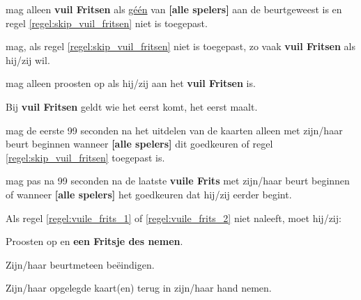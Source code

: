 \vervolgLijst{}
    \item \EenSpeler mag alleen \textbf{vuil Fritsen} als \ul{g\'e\'en} van \textbf{[alle spelers]} aan de beurt\footnotemark[1] geweest is en regel \ref{regel:skip_vuil_fritsen} niet is toegepast. 
\eindLijst{}

\vervolgLijst{}
    \item \EenSpeler mag, als regel \ref{regel:skip_vuil_fritsen} niet is toegepast, zo vaak \textbf{vuil Fritsen} als hij/zij wil. 
\eindLijst{}

\vervolgLijst{}
    \item \EenSpeler mag alleen proosten op  als hij/zij aan het \textbf{vuil Fritsen} is.
\eindLijst{}

\vervolgLijst{}
    \item Bij \textbf{vuil Fritsen} geldt wie het eerst komt, het eerst maalt.
\eindLijst{}


\vervolgLijst{}
    \item \Willem mag de eerste 99 seconden na het uitdelen van de kaarten alleen met zijn/haar beurt beginnen wanneer \textbf{[alle spelers]} dit goedkeuren of regel \ref{regel:skip_vuil_fritsen} toegepast is. 
    \label{regel:vuile_frits_1}
\eindLijst{}

\vervolgLijst{}
    \item \Willem mag pas na 99 seconden na de laatste \textbf{vuile Frits} met zijn/haar beurt beginnen of wanneer \textbf{[alle spelers]} het goedkeuren dat hij/zij eerder begint.
    \label{regel:vuile_frits_2}
\eindLijst{}

\vervolgLijst{}
    \item Als \Willem regel \ref{regel:vuile_frits_1} of \ref{regel:vuile_frits_2} niet naleeft, moet hij/zij:
    \puntLijst{}
        \item Proosten op  en \textbf{een Fritsje des nemen}\footnotemark[3].
        \item Zijn/haar beurt\footnotemark[1] meteen beëindigen.
        \item Zijn/haar opgelegde kaart(en) terug in zijn/haar hand nemen.
    \eindPuntLijst{}
    \label{regel:kaarten_terugnemen_1}
\eindLijst{}


